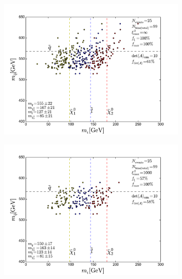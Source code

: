 \documentclass[twoside,english]{uiofysmaster}
\begin{document}
\begin{figure}[hbt]
	\centering
	\begin{subfigure}[b]{0.45\textwidth}
		\includegraphics[width=\textwidth]{figures/improving_combinatorics/herwigpp-nosmear-4combosum-detAcut_10-xisqcut_none-nocomb-TMP.pdf} 
		\caption{ }
		\label{fig:detAcut_a}
	\end{subfigure}
	\begin{subfigure}[b]{0.45\textwidth}
		\includegraphics[width=\textwidth]{figures/improving_combinatorics/herwigpp-nosmear-4combosum-detAcut_10-xisqcut_1000-nocomb-TMP.pdf}
		\caption{ } 
		\label{fig:detAcut_b}
	\end{subfigure}


\end{figure}
\end{document}
